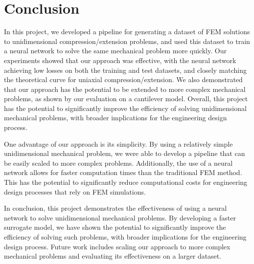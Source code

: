 \documentclass[11pt]{scrartcl} %
\begin{document}
\section{Conclusion}
In this project, we developed a pipeline for generating a dataset of FEM solutions to unidimensional compression/extension problems, and used this dataset to train a neural network to solve the same mechanical problem more quickly. Our experiments showed that our approach was effective, with the neural network achieving low losses on both the training and test datasets, and closely matching the theoretical curve for uniaxial compression/extension. We also demonstrated that our approach has the potential to be extended to more complex mechanical problems, as shown by our evaluation on a cantilever model. Overall, this project has the potential to significantly improve the efficiency of solving unidimensional mechanical problems, with broader implications for the engineering design process.

One advantage of our approach is its simplicity. By using a relatively simple unidimensional mechanical problem, we were able to develop a pipeline that can be easily scaled to more complex problems. Additionally, the use of a neural network allows for faster computation times than the traditional FEM method. This has the potential to significantly reduce computational costs for engineering design processes that rely on FEM simulations.

In conclusion, this project demonstrates the effectiveness of using a neural network to solve unidimensional mechanical problems. By developing a faster surrogate model, we have shown the potential to significantly improve the efficiency of solving such problems, with broader implications for the engineering design process. Future work includes scaling our approach to more complex mechanical problems and evaluating its effectiveness on a larger dataset.
\end{document}
